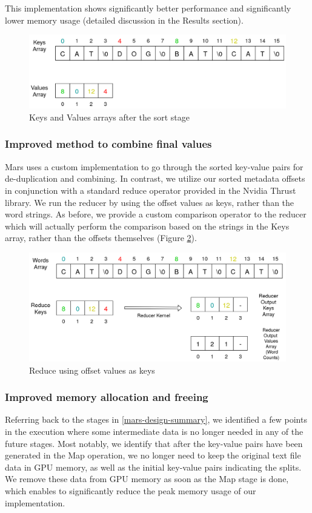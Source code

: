 \documentclass{article}
\begin{document}
This implementation shows significantly better performance and significantly lower memory usage (detailed discussion in the Results section).
\begin{figure}
    \centering
    \includegraphics[width=0.9\linewidth]{images/map-kv-sorted.png}
    \caption{Keys and Values arrays after the sort stage}
    \label{fig:map-kv-sorted}
\end{figure}



\subsubsection{Improved method to combine final values}
Mars uses a custom implementation to go through the sorted key-value pairs for de-duplication and combining. In contrast, we utilize our sorted metadata offsets in conjunction with a standard reduce operator provided in the Nvidia Thrust library. We run the reducer by using the offset values as keys, rather than the word strings. As before, we provide a custom comparison operator to the reducer which will actually perform the comparison based on the strings in the Keys array, rather than the offsets themselves (Figure \ref{fig:reduce-kv-out}).

\begin{figure}
    \centering
    \includegraphics[width=0.9\linewidth]{images/reduce-kv-out.png}
    \caption{Reduce using offset values as keys}
    \label{fig:reduce-kv-out}
\end{figure}


\subsubsection{Improved memory allocation and freeing} \label{improved-free}
Referring back to the stages in \ref{mars-design-summary}, we identified a few points in the execution where some intermediate data is no longer needed in any of the future stages. Most notably, we identify that after the key-value pairs have been generated in the Map operation, we no longer need to keep the original text file data in GPU memory, as well as the initial key-value pairs indicating the splits. We remove these data from GPU memory as soon as the Map stage is done, which enables to significantly reduce the peak memory usage of our implementation.
\end{document}
